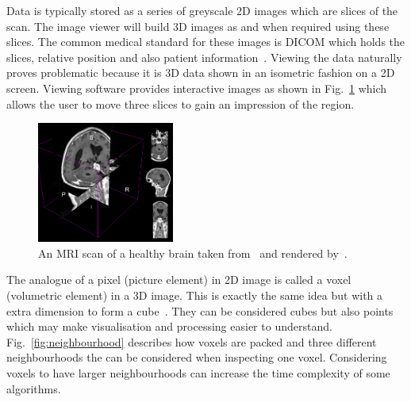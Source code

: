\documentclass[journal]{IEEEtran}
\begin{document}
Data is typically stored as a series of greyscale 2D images which are slices of the scan.
The image viewer will build 3D images as and when required using these slices.
The common medical standard for these images is DICOM which holds the slices, relative position and also patient information~\cite{dicom11nema}.
Viewing the data naturally proves problematic because it is 3D data shown in an isometric fashion on a 2D screen.
Viewing software provides interactive images as shown in Fig.~\ref{fig:3d} which allows the user to move three slices to gain an impression of the region.

\begin{figure}[!htb]
   \centering
   \includegraphics[width = 0.4\textwidth]{Figures/3Dview.png}
   \caption{An MRI scan of a healthy brain taken from~\cite{cia} and rendered by~\cite{slicer}.}
   \label{fig:3d}
\end{figure}

The analogue of a pixel (picture element) in 2D image is called a voxel (volumetric element) in a 3D image.
This is exactly the same idea but with a extra dimension to form a cube~\cite{lohmann1998volumetric}.
They can be considered cubes but also points which may make visualisation and processing easier to understand.
Fig.~\ref{fig:neighbourhood} describes how voxels are packed and three different neighbourhoods the can be considered when inspecting one voxel. 
Considering voxels to have larger neighbourhoods can increase the time complexity of some algorithms.
\end{document}
